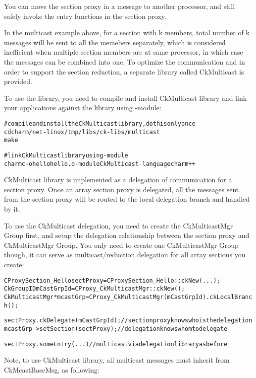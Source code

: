 You can move the section proxy in a message to another processor, and still 
safely invoke the entry functions in the section proxy.

In the multicast example above, for a section with k members, total number 
of k messages will be sent to all the memebers separately, which is considered 
inefficient when multiple section members are at same processor, in which case 
the messages can be combined into one. To optimize the communication and in 
order to support the section reduction, a separate library called CkMulticast 
is provided.

To use the library, you need to compile and install CkMulticast library and 
link your applications against the library using -module:

\begin{alltt}
  # compile and install the CkMulticast library, do this only once
  cd charm/net-linux/tmp/libs/ck-libs/multicast
  make

  # link CkMulticast library using -module
  charmc  -o hello hello.o -module CkMulticast -language charm++ 
\end{alltt}

CkMulticast library is implemented as a delegation of communication for a 
section proxy. Once an array section proxy is delegated, all the messages sent
from the section proxy will be routed to the local delegation branch and 
handled by it. 

To use the CkMulticast delegation, you need to create the CkMulticastMgr Group 
first, and setup the delegation relationship between the section proxy and 
CkMulticastMgr Group. You only need to create one CkMulticastMgr Group though,
it can serve as multicast/reduction delegation for all array sections you 
create:

\begin{alltt}
  CProxySection_Hello sectProxy = CProxySection_Hello::ckNew(...);
  CkGroupID mCastGrpId = CProxy_CkMulticastMgr::ckNew();
  CkMulticastMgr *mcastGrp = CProxy_CkMulticastMgr(mCastGrpId).ckLocalBranch();

  sectProxy.ckDelegate(mCastGrpId);  //section proxy knows who is the delegation
  mcastGrp->setSection(sectProxy);   //delegation knows whom to delegate

  sectProxy.someEntry(...)           //multicast via delegation library as before
\end{alltt}

Note, to use CkMulticast library, all multicast messages must inherit from 
CkMcastBaseMsg, as following:

